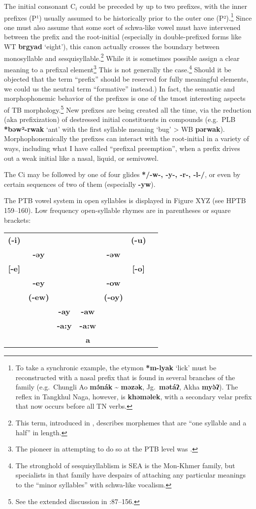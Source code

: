 The initial consonant $\textrm{C}_i$ could be preceded by up to two prefixes, with the inner prefixes (P¹) usually assumed to be historically prior to the outer one (P²).\footnote{To take a synchronic example, the etymon \textbf{*m-lyak} ‘lick’ must be reconstructed with a nasal prefix that is found in several branches of the family (e.g.\ Chungli Ao \textbf{mə́nák} \textasciitilde{} \textbf{məzək}, Jg.~\textbf{mətáʔ}, Akha \textbf{myə̀ʔ}). The reflex in Tangkhul Naga, however, is \textbf{khəməlek}, with a secondary velar prefix that now occurs before all TN verbs.}
Since one must also assume that some sort of schwa-like vowel must have intervened between the prefix and the root-initial (especially in double-prefixed forms like WT \textbf{brgyad} ‘eight’), this canon actually crosses the boundary between monosyllable and sesquisyllable.\footnote{This term, introduced in \citealt{JAM1973Tonogenesis}, describes morphemes that are “one syllable and a half” in length.} While it is sometimes possible assign a clear meaning to a prefixal element\footnote{The pioneer in attempting to do so at the PTB level was \citealt{WOL1929}.} This is not generally the case.\footnote{The stronghold of sesquisyllablism is SEA is the Mon-Khmer family, but specialists in that family have despairs of attaching any particular meanings to the “minor syllables” with schwa-like vocalism.}  Should it be objected that the term “prefix” should be reserved for fully meaningful elements, we could us the neutral term “formative” instead.)
In fact, the semantic and morphophonemic behavior of the prefixes is one of the tmost interesting aspects of TB morphology.\footnote{See the extended discussion in \citealt{HPTB}:87–156.} New prefixes are being created all the time, via the reduction (aka prefixization) of destressed initial constituents in compounds (e.g.\ PLB \textbf{*bəw²-rwak} ‘ant’ with the first syllable meaning ‘bug’ > WB \textbf{pərwak}). 
Morphophonemically the prefixes can interact with the root-initial in a variety of ways, including what I have called “prefixal preemption”, when a prefix drives out a weak initial like a nasal, liquid, or semivowel.

The Ci may be followed by one of four glides \textbf{*/-w-, -y-, -r-, -l-/}, or even by certain sequences of two of them (especially \textbf{-yw}).

The PTB vowel system in open syllables is displayed in Figure XYZ (see HPTB 159–160). Low frequency open-syllable rhymes are in parentheses or square brackets:

\begin{tabular}{ccccccc}
\textbf{(-i)} & & & & & \textbf{(-u)}\\
 & \textbf{-əy} & & & \textbf{-əw} & \\
\textbf{[-e]} & & & & & \textbf{[-o]}\\
 & \textbf{-ey} & & & \textbf{-ow} & \\
 & \textbf{(-ew)} & & & \textbf{(-oy)} & \\
 & & \textbf{-ay} & \textbf{-aw} & & \\
 & & \textbf{-a:y} & \textbf{-a:w} & & \\
 & & & \textbf{a} & & & \\
\end{tabular}

